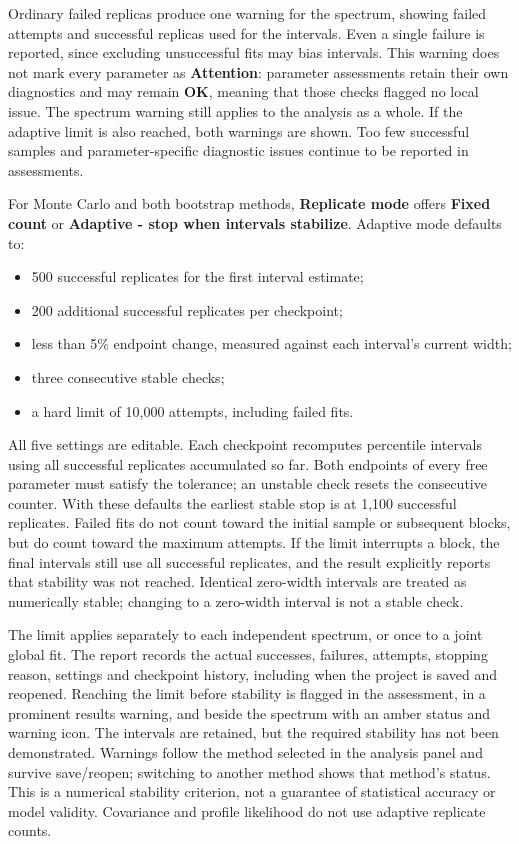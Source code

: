 \documentclass[
  10pt,
  a4paper,
  oneside]{scrreprt}
\providecommand{\tightlist}{%
  \setlength{\itemsep}{0pt}\setlength{\parskip}{0pt}}
\begin{document}
Ordinary failed replicas produce one warning for the spectrum, showing
failed attempts and successful replicas used for the intervals. Even a
single failure is reported, since excluding unsuccessful fits may bias
intervals. This warning does not mark every parameter as
\textbf{Attention}: parameter assessments retain their own diagnostics
and may remain \textbf{OK}, meaning that those checks flagged no local
issue. The spectrum warning still applies to the analysis as a whole. If
the adaptive limit is also reached, both warnings are shown. Too few
successful samples and parameter-specific diagnostic issues continue to
be reported in assessments.

For Monte Carlo and both bootstrap methods, \textbf{Replicate mode}
offers \textbf{Fixed count} or \textbf{Adaptive - stop when intervals
stabilize}. Adaptive mode defaults to:

\begin{itemize}
\tightlist
\item
  500 successful replicates for the first interval estimate;
\item
  200 additional successful replicates per checkpoint;
\item
  less than 5\% endpoint change, measured against each interval's
  current width;
\item
  three consecutive stable checks;
\item
  a hard limit of 10,000 attempts, including failed fits.
\end{itemize}

All five settings are editable. Each checkpoint recomputes percentile
intervals using all successful replicates accumulated so far. Both
endpoints of every free parameter must satisfy the tolerance; an
unstable check resets the consecutive counter. With these defaults the
earliest stable stop is at 1,100 successful replicates. Failed fits do
not count toward the initial sample or subsequent blocks, but do count
toward the maximum attempts. If the limit interrupts a block, the final
intervals still use all successful replicates, and the result explicitly
reports that stability was not reached. Identical zero-width intervals
are treated as numerically stable; changing to a zero-width interval is
not a stable check.

The limit applies separately to each independent spectrum, or once to a
joint global fit. The report records the actual successes, failures,
attempts, stopping reason, settings and checkpoint history, including
when the project is saved and reopened. Reaching the limit before
stability is flagged in the assessment, in a prominent results warning,
and beside the spectrum with an amber status and warning icon. The
intervals are retained, but the required stability has not been
demonstrated. Warnings follow the method selected in the analysis panel
and survive save/reopen; switching to another method shows that method's
status. This is a numerical stability criterion, not a guarantee of
statistical accuracy or model validity. Covariance and profile
likelihood do not use adaptive replicate counts.
\end{document}
